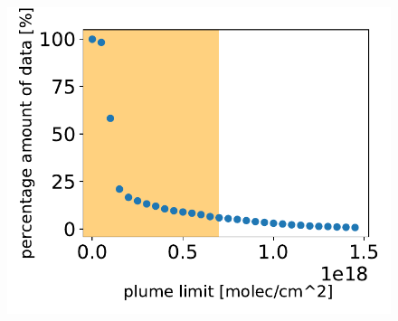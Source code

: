 \begin{figure}
	\centering
	\includegraphics[width=0.7\linewidth]{Bilder/percentage_minSO2}
	\caption{}
	\label{fig:percentageminso2}
\end{figure}

